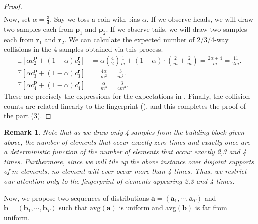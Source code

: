 \documentclass[10pt]{article} %
\newcommand{\E}{\mathbb{E}}
\theoremstyle{plain}
\newtheorem{remark}[theorem]{Remark}
\newcommand{\bp}{\textbf{p}}
\newcommand{\br}{\textbf{r}}
\newcommand{\avg}{\mathrm{avg}}
\newcommand{\ba}{\textbf{a}}
\newcommand{\bb}{\textbf{b}}
\begin{document}
\begin{proof}
\begin{align}
	\end{align}
	Now, set $\alpha=\frac34$. Say we toss a coin with bias $\alpha$. If we observe heads, we will draw two samples each from $\bp_1$ and $\bp_2$. If we observe tails, we will draw two samples each from $\br_1$ and $\br_2$. We can calculate the expected number of  2/3/4-way collisions in the 4 samples obtained via this process.
	\begin{align*}
		\E[\alpha c_2^{\bp} + (1-\alpha) c_2^{\br}] &= \alpha \binom{4}{2} \frac{1}{m} + (1-\alpha) \cdot \left(\frac{2}{m} + \frac{2}{m}\right) = \frac{2\alpha + 4}{m} = \frac{11}{2m}. \\
		\E[\alpha c_3^{\bp} + (1-\alpha) c_3^{\br}] &= \frac{4\alpha }{m^2} = \frac{3}{m^2}. \\
		\E[\alpha c_4^{\bp} + (1-\alpha) c_4^{\br}] &= \frac{\alpha }{m^3} = \frac{3}{4m^3}.
	\end{align*}
	These are precisely the expressions for the expectations in . 
	Finally, the collision counts are related linearly to the fingerprint (), and this completes the proof of the part (3).
\end{proof}

\begin{remark}
	Note that as we draw only 4 samples from the building block given above, the number of elements that occur exactly zero times and exactly once  are a deterministic function of the number of elements that occur exactly 2,3 and 4 times. Furthermore, since we will tile up the above instance over disjoint supports of $m$ elements, no element will ever occur more than 4 times. Thus, we restrict our attention only to the fingerprint of elements appearing 2,3 and 4 times. %
\end{remark}


Now, we propose two sequences of distributions $\ba = (\ba_1, \cdots, \ba_T)$ and $\bb = (\bb_1, \cdots, \bb_T)$ such that $\avg(\ba)$ is uniform and $\avg(\bb)$ is far from uniform. %
\end{document}
